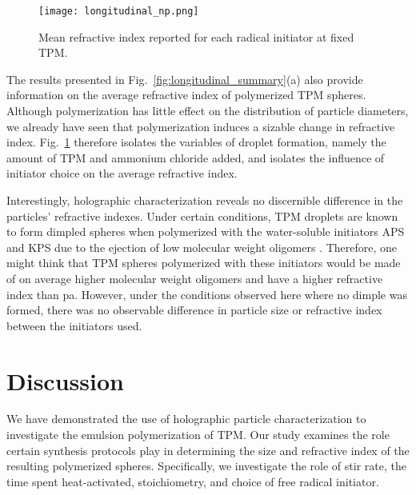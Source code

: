 \begin{figure}
    \centering
    \texttt{[image: longitudinal\_np.png]}
    \caption{Mean refractive index reported for each radical initiator
    at fixed TPM.}
    \label{fig:longitudinal_np}
\end{figure}

The results presented in Fig.~\ref{fig:longitudinal_summary}(a) also provide information
on the average refractive index of polymerized TPM spheres. Although polymerization
has little effect on the distribution of particle diameters, we already have seen that
polymerization induces a sizable change in refractive index. Fig.~\ref{fig:longitudinal_np} therefore isolates the
variables of droplet formation, namely the amount of TPM and ammonium chloride added,
and isolates the influence of initiator choice on the average refractive index.


Interestingly, holographic characterization reveals no discernible difference
in the particles' refractive indexes.
Under certain conditions, TPM droplets are known to form dimpled spheres when polymerized
with the water-soluble initiators APS and KPS due to the ejection of low molecular weight
oligomers \cite{sacanna11}.
Therefore, one might think that TPM spheres polymerized with these initiators would be
made of on average higher molecular weight oligomers and have a higher refractive index
than pa. However, under the conditions observed here where no dimple was formed, there
was no observable difference in particle size or refractive index between the initiators
used.

\section{Discussion}

We have demonstrated the use of holographic particle characterization
to investigate the emulsion polymerization of TPM. Our study examines the
role certain synthesis protocols play in determining the
size and refractive index of the resulting polymerized spheres. Specifically,
we investigate the role of stir rate, the time spent heat-activated, stoichiometry, and choice of
free radical initiator.

